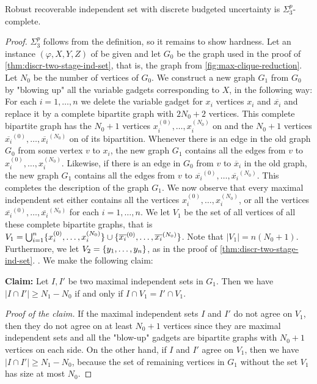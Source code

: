 \begin{theorem}
\label{thm:recoverable-ind-set}
Robust recoverable independent set with discrete budgeted uncertainty is $\Sigma_3^p$-complete.
\end{theorem}
\begin{proof}
 $\Sigma_3^p$ follows from the definition, so it remains to show hardness.
Let an instance $(\varphi, X, Y, Z)$ of {\radj} be given and let $G_0$ be the graph used in the proof of \cref{thm:discr-two-stage-ind-set}, that is, the graph from \cref{fig:max-clique-reduction}. 
Let $N_0$ be the number of vertices of $G_0$. 
We construct a new graph $G_1$ from $G_0$ by "blowing up" all the variable gadgets corresponding to $X$, in the following way: For each $i=1,\dots,n$ we delete the variable gadget for $x_i$  vertices $x_i$ and $\overline{x_i}$ and replace it by a complete bipartite graph with $2N_0 + 2$ vertices.
 This complete bipartite graph has the $N_0+1$ vertices $x_i^{(0)},\dots,x_i^{(N_0)}$ on  and the $N_0+1$ vertices $\overline{x_i}^{(0)},\dots,\overline{x_i}^{(N_0)}$ on  of its bipartition.
 Whenever there is an edge in the old graph $G_0$ from some vertex $v$ to $x_i$, the new graph $G_1$ contains all the edges from $v$ to $x_i^{(0)},\dots,x_i^{(N_0)}$. 
 Likewise, if there is an edge in $G_0$ from $v$ to $\overline x_i$ in the old graph, the new graph $G_1$ contains all the edges from $v$ to $\overline{x_i}^{(0)},\dots,\overline{x_i}^{(N_0)}$. 
 This completes the description of the graph $G_1$. 
 We now observe that every maximal independent set either contains all the vertices $x_i^{(0)},\dots,x_i^{(N_0)}$, or all the vertices $\overline{x_i}^{(0)},\dots,\overline{x_i}^{(N_0)}$ for each $i=1,\dots,n$. 
 We let $V_1$ be the set of all vertices of all these complete bipartite graphs, that is $V_1 = \bigcup_{i=1}^n \{ x_i^{(0)}, \ldots, x_i^{(N_0)} \} \cup \{ \overline{x_i}^{(0)}, \ldots, \overline{x_i}^{(N_0)} \}$. Note that $|V_1| = n(N_0+1)$. Furthermore, we let $V_2 = \{ y_1, \ldots, y_n \}$, as in the proof of \cref{thm:discr-two-stage-ind-set}.
. We make the following claim:

\textbf{Claim:} Let $I, I'$ be two maximal independent sets in $G_1$. Then we have $|I \cap I'| \geq N_1 - N_0$ if and only if $I \cap V_1 = I' \cap V_1$.

\emph{Proof of the claim.} If the maximal independent sets $I$ and $I'$ do not agree on $V_1$, then they do not agree on at least $N_0 + 1$ vertices since they are maximal independent sets and all the "blow-up" gadgets are bipartite graphs with $N_0+1$ vertices on each side. 
On the other hand, if $I$ and $I'$ agree on $V_1$, then we have $|I \cap I'| \geq N_1 - N_0$, because the set of remaining vertices in $G_1$ without the set $V_1$ has size at most $N_0$.



\end{proof}
